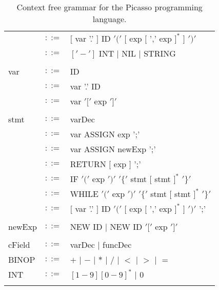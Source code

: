\documentclass{article}
\begin{document}
\begin{table}[h]
\begin{tabular}{ l c l }
         & $::=$ & $[$ var '.' $]$ ID $'('$ $[$ exp $[$ ',' exp $]^{*}$ $]$ $')'$ \\
         & $::=$ & $['-']$ INT $|$ NIL $|$ STRING                                 \\
\\
var      & $::=$ & ID                  \\
         & $::=$ & var '.' ID          \\
         & $::=$ & var $'['$ exp $']'$ \\
\\  
stmt     & $::=$ & varDec                                                             \\
         & $::=$ & var ASSIGN exp ';'                                                 \\
         & $::=$ & var ASSIGN newExp ';'                                              \\
         & $::=$ & RETURN $[$ exp $]$ ';'                                             \\
         & $::=$ & IF $'('$ exp $')'$ $'\{'$ stmt $[$ stmt $]^{*}$ $'\}'$             \\
         & $::=$ & WHILE $'('$ exp $')'$ $'\{'$ stmt $[$ stmt $]^{*}$ $'\}'$          \\
         & $::=$ & $[$ var '.' $]$ ID $'('$ $[$ exp $[$ ',' exp $]^{*}$ $]$ $')'$ ';' \\
\\
newExp   & $::=$ & NEW ID $|$ NEW ID $'['$ exp $']'$ \\
\\
cField   & $::=$ & varDec $|$ funcDec \\
BINOP    & $::=$ & $+$ $|$ $-$ $|$ $*$ $|$ $/$ $|$ $<$ $|$ $>$ $|$ $=$ \\
INT      & $::=$ & $[1-9][0-9]^{*}$ $|$ $0$                            \\
\\
\end{tabular}
\caption{
Context free grammar for the Picasso programming language.
\label{Table_CFG_Of_Picasso}}
\end{table}
\end{document}

